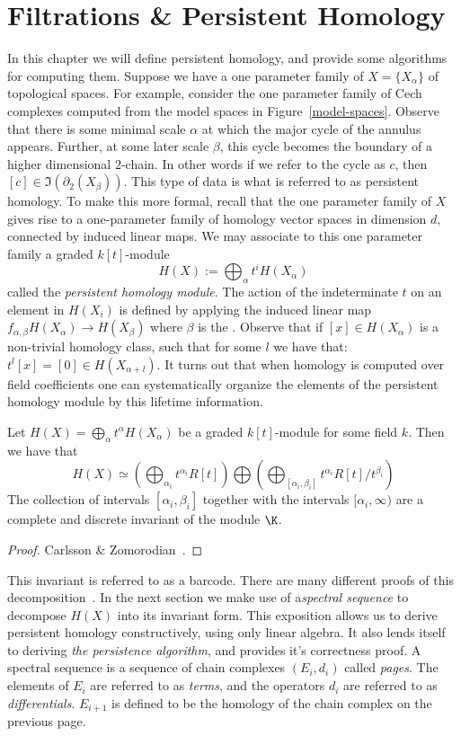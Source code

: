 \chapter{Filtrations \& Persistent Homology}
In this chapter we will define persistent homology, and provide some algorithms for computing them. Suppose we have a one parameter family of  $X = \{ X_\alpha \}$ of topological spaces. For example, consider the one parameter family of Cech complexes computed from the model spaces in Figure~\ref{model-spaces}. Observe that there is some minimal scale $\alpha$ at which the major cycle of the annulus appears. Further, at some later scale $\beta$, this cycle becomes the boundary of a higher dimensional $2$-chain. In other words if we refer to the cycle as $c$, then $[c] \in \Im(\partial_2(X_\beta))$. This type of data is what is referred to as persistent homology. To make this more formal, recall that the one parameter family of $X$ gives rise to a one-parameter family of homology vector spaces in dimension $d$, connected by induced linear maps. We may associate to this one parameter family a graded $k[t]$-module \[ H(X) := \bigoplus_\alpha t^i H(X_\alpha) \] called the \emph{persistent homology module}. The action of the indeterminate $t$ on an element in $H(X_i)$ is defined by applying the induced linear map $f_{\alpha, \beta} H(X_{\alpha}) \rightarrow H(X_{\beta})$ where $\beta$ is the . Observe that if $[x] \in H(X_\alpha)$ is a non-trivial homology class, such that for some $l$ we have that: $t^l[x] = [0] \in H(X_{\alpha+l})$. It turns out that when homology is computed over field coefficients one can systematically organize the elements of the persistent homology module by this lifetime information. 
\begin{theorem} Let $H(X) = \bigoplus_\alpha t^\alpha H(X_\alpha)$ be a graded $k[t]$-module for some field $k$. Then we have that 
\[ H(X) \simeq \left( \bigoplus_{\alpha_i}t^{\alpha_i}R[t] \right) \bigoplus \left( \bigoplus_{[\alpha_i, \beta_i]} t^{\alpha_i}R[t]/t^{\beta_i}  \right)  \]
The collection of intervals $[\alpha_i,\beta_i]$ together with the intervals $[\alpha_i, \infty)$ are a complete and discrete invariant 
of the module $\K$. 
\end{theorem}
\begin{proof}
Carlsson \& Zomorodian~\cite{zc-2005}.
\end{proof}
This invariant is referred to as a barcode. There are many different proofs of this decomposition~\cite{crawley-bovey,quiver-thing,zc-2005}. In the next section we make use of a\emph{spectral sequence} to decompose $H(X)$ into its invariant form. This exposition allows us to derive persistent homology constructively, using only linear algebra. It also lends itself to deriving \emph{the persistence algorithm}, and provides it's correctness proof. A spectral sequence is a sequence of chain complexes $(E_i, d_i)$ called \emph{pages}. The elements of $E_i$ are referred to as \emph{terms}, and the operators $d_i$ are referred to as \emph{differentials}.  
$E_{i+1}$ is defined to be the homology of the chain complex on the previous page.

